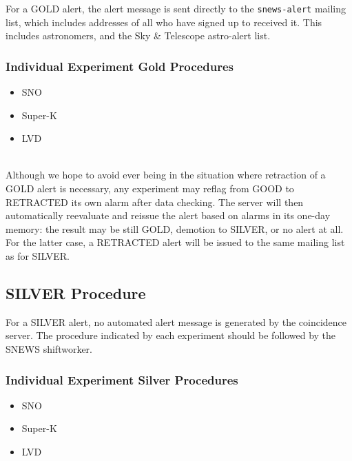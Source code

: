 \documentclass{article}
\begin{document}
For a GOLD alert, the alert message is sent directly to the 
{\tt snews-alert} mailing list, which includes addresses of all
who have signed up to received it. This includes astronomers,
and the Sky \& Telescope astro-alert list. 

\subsubsection{Individual Experiment Gold Procedures}

\begin{itemize}

\item SNO
\item Super-K
\item LVD

\end{itemize}


\\ Although we hope
to avoid ever being in the situation where retraction of a GOLD alert
is necessary, any experiment may reflag from GOOD to RETRACTED its
own alarm after data checking.  The server will then automatically
reevaluate and reissue the alert based on alarms in its one-day
memory: the result may be still GOLD, demotion to SILVER, or no alert
at all.  For the latter case, a RETRACTED alert will be issued to the
same mailing list as for SILVER.

\subsection{SILVER Procedure}\label{SILVER}
For a SILVER alert, no automated alert message
is generated by the coincidence server. 
The procedure indicated by each experiment should be followed by
the SNEWS shiftworker.\\

\subsubsection{Individual Experiment Silver Procedures}

\begin{itemize}

\item SNO
\item Super-K
\item LVD

\end{itemize}
\end{document}
